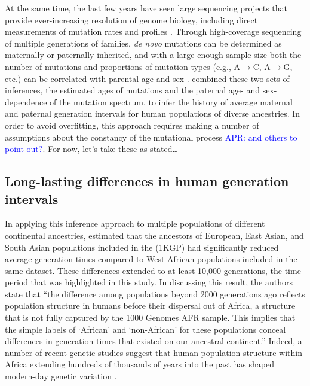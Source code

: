 \documentclass[]{article}
\newcommand{\aprcomment}[1]{{\textcolor{blue}{APR: #1}}}
\begin{document}
At the same time, the last few years have seen large sequencing projects that
provide ever-increasing resolution of genome biology, including direct
measurements of mutation rates and profiles
\citep{jonsson2017parental,halldorsson2019characterizing}. Through
high-coverage sequencing of multiple generations of families, \emph{de novo}
mutations can be determined as maternally or paternally inherited, and with a
large enough sample size both the number of mutations and proportions of
mutation types (e.g., A$\rightarrow$C, A$\rightarrow$G, etc.) can be correlated
with parental age and sex \citep{jonsson2017parental}. \citet{wang2023human}
combined these two sets of inferences, the estimated ages of mutations and the
paternal age- and sex-dependence of the mutation spectrum, to infer the history
of average maternal and paternal generation intervals for human populations of
diverse ancestries. In order to avoid overfitting, this approach requires
making a number of assumptions about the constancy of the mutational process
\cite{harris,dewitt} \aprcomment{and others to point out?}. For now, let's take
these as stated\ldots

\subsection*{Long-lasting differences in human generation intervals}

In applying this inference approach to multiple populations of different
continental ancestries, \citet{wang2023human} estimated that the ancestors of
European, East Asian, and South Asian populations included in the
\citet{1000genomes2015} (1KGP) had significantly reduced average generation
times compared to West African populations included in the same dataset. These
differences extended to at least 10,000 generations, the time period that was
highlighted in this study. In discussing this result, the authors state that
``the difference among populations beyond 2000 generations ago reflects
population structure in humans before their dispersal out of Africa, a
structure that is not fully captured by the 1000 Genomes AFR sample. This
implies that the simple labels of `African' and `non-African' for these
populations conceal differences in generation times that existed on our
ancestral continent.'' Indeed, a number of recent genetic studies suggest that
human population structure within Africa extending hundreds of thousands of
years into the past has shaped modern-day genetic variation
\citep{plagnol2006possible,hammer2011genetic,hsieh2016model,hey2018phylogeny,ragsdale2019models,durvasula2020recovering,lorente2019whole}.
\end{document}
